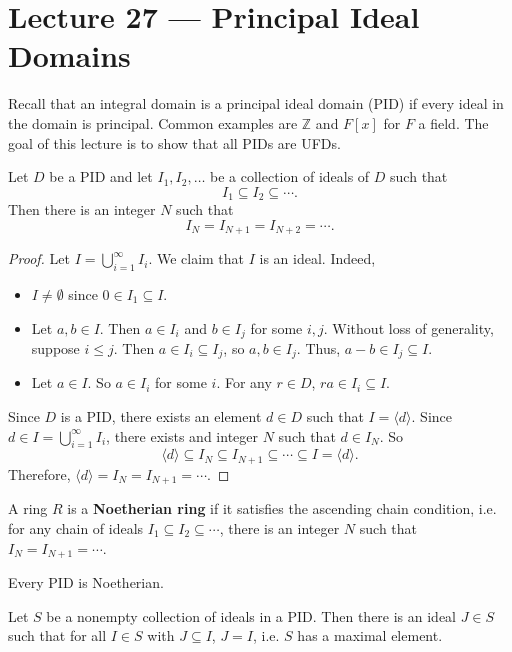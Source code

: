 \section{Lecture 27 — Principal Ideal Domains}

Recall that an integral domain is a principal ideal domain (PID) if every ideal in the domain is principal. Common examples are $\mathbb Z$ and $F[x]$ for $F$ a field. The goal of this lecture is to show that all PIDs are UFDs.

\begin{lemma}
	Let $D$ be a PID and let $I_1,I_2,\hdots$ be a collection of ideals of $D$ such that
	$$I_1\subseteq I_2\subseteq\cdots.$$
	Then there is an integer $N$ such that
	$$I_N=I_{N+1}=I_{N+2}=\cdots.$$
\end{lemma}

\begin{proof}
	Let $I=\bigcup_{i=1}^\infty I_i$. We claim that $I$ is an ideal. Indeed,
	\begin{itemize}
		\item $I\neq\emptyset$ since $0\in I_1\subseteq I$.
		\item Let $a,b\in I$. Then $a\in I_i$ and $b\in I_j$ for some $i,j$. Without loss of generality, suppose $i\leq j$. Then $a\in I_i\subseteq I_j$, so $a,b\in I_j$. Thus, $a-b\in I_j\subseteq I$.
		\item Let $a\in I$. So $a\in I_i$ for some $i$. For any $r\in D$, $ra\in I_i\subseteq I$.
	\end{itemize}
	Since $D$ is a PID, there exists an element $d\in D$ such that $I=\langle d\rangle$. Since $d\in I=\bigcup_{i=1}^\infty I_i$, there exists and integer $N$ such that $d\in I_N$. So
	$$\langle d\rangle\subseteq I_N\subseteq I_{N+1}\subseteq\cdots\subseteq I=\langle d\rangle.$$
	Therefore, $\langle d\rangle=I_N=I_{N+1}=\cdots$.
\end{proof}

\begin{definition}
	A ring $R$ is a \textbf{Noetherian ring} if it satisfies the ascending chain condition, i.e. for any chain of ideals $I_1\subseteq I_2\subseteq\cdots$, there is an integer $N$ such that $I_N=I_{N+1}=\cdots$.
\end{definition}

\begin{corollary}
	Every PID is Noetherian.
\end{corollary}

\begin{lemma}\label{lem:max_ideal}
	Let $S$ be a nonempty collection of ideals in a PID. Then there is an ideal $J\in S$ such that for all $I\in S$ with $J\subseteq I$, $J=I$, i.e. $S$ has a maximal element.
\end{lemma}

